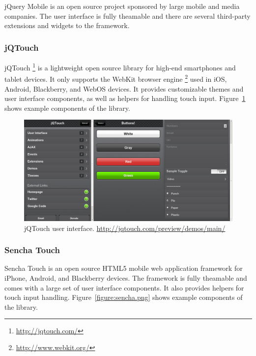 jQuery Mobile is an open source project sponsored by large mobile and
media companies. The user interface is fully theamable and there are
several third-party extensions and widgets to the framework.

\subsubsection{jQTouch}

jQTouch \footnote{\url{http://jqtouch.com/}} is a lightweight open
source library for high-end smartphones and tablet devices. It only
supports the WebKit browser
engine \footnote{\url{http://www.webkit.org/}} used in iOS, Android,
Blackberry, and WebOS devices. It provides customizable themes and
user interface components, as well as helpers for handling touch
input. Figure~\ref{figure:jqtouch.png} shows example components of the
library.

\begin{figure}[ht]
  \begin{center}
    \includegraphics[width=\textwidth]{images/jqtouch.png}
    \caption{jQTouch user
      interface. \url{http://jqtouch.com/preview/demos/main/}}
    \label{figure:jqtouch.png}
  \end{center}
\end{figure}

\subsubsection{Sencha Touch}

Sencha Touch is an open source HTML5 mobile web application framework
for iPhone, Android, and Blackberry devices. The framework is fully
theamable and comes with a large set of user interface components. It
also provides helpers for touch input
handling. Figure~\ref{figure:sencha.png} shows example components of
the library.

